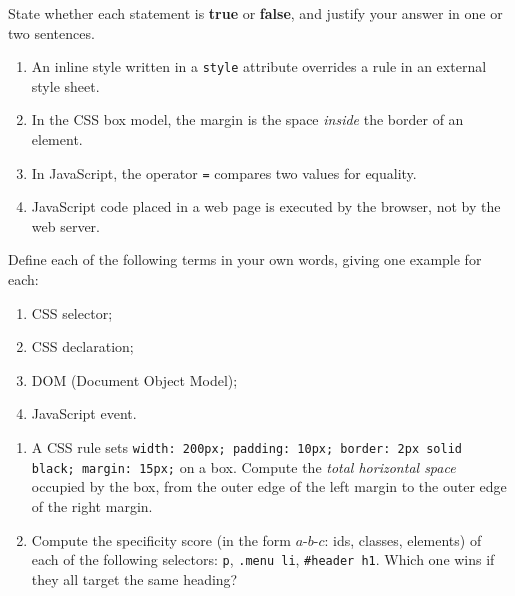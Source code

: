 \documentclass[11pt]{article}
\newcommand{\cle}[1]{{\popxbold\color{popdark}#1}}
\newcounter{popsec}
\newcounter{popsub}
\newcommand{\courssub}[1]{%
  \stepcounter{popsub}%
  \par\vspace{9pt}\noindent{\popxbold\fontsize{11.5}{13}\selectfont\color{popink}{\color{poporange}\thepopsec.\thepopsub}\hspace{6pt}#1}\par\nopagebreak\vspace{4pt}
}
\begin{document}
\begin{exercice}
State whether each statement is \textbf{true} or \textbf{false}, and justify your answer in one or two sentences.
\begin{enumerate}
\item An inline style written in a \texttt{style} attribute overrides a rule in an external style sheet.
\item In the CSS box model, the margin is the space \emph{inside} the border of an element.
\item In JavaScript, the operator \texttt{=} compares two values for equality.
\item JavaScript code placed in a web page is executed by the browser, not by the web server.
\end{enumerate}
\end{exercice}

\begin{exercice}[Definitions]
Define each of the following terms in your own words, giving one example for each:
\begin{enumerate}
\item \cle{CSS selector};
\item \cle{CSS declaration};
\item \cle{DOM (Document Object Model)};
\item \cle{JavaScript event}.
\end{enumerate}
\end{exercice}

\begin{exercice}
\begin{enumerate}
\item A CSS rule sets \texttt{width: 200px; padding: 10px; border: 2px solid black; margin: 15px;} on a box. Compute the \emph{total horizontal space} occupied by the box, from the outer edge of the left margin to the outer edge of the right margin.
\item Compute the specificity score (in the form $a$-$b$-$c$: ids, classes, elements) of each of the following selectors: \texttt{p}, \texttt{.menu li}, \texttt{\#header h1}. Which one wins if they all target the same heading?
\end{enumerate}
\end{exercice}

\courssub{I practise}
\end{document}
